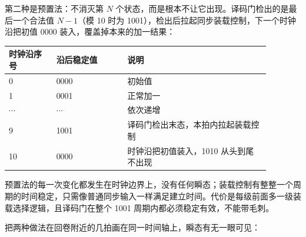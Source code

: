 第二种是预置法：不消灭第 $N$ 个状态，而是根本不让它出现。译码门检出的是最后一个合法值 $N-1$（模 10 时为 1001），检出后拉起同步装载控制，下一个时钟沿把初值 0000 装入，覆盖掉本来的加一结果：

\begin{longtable}{L{0.16\linewidth}L{0.24\linewidth}L{0.48\linewidth}}
\toprule
时钟沿序号 & 沿后稳定值 & 说明 \\
 & 0000 & 初始值 \\
1 & 0001 & 正常加一 \\
$\cdots$ & $\cdots$ & 依次递增 \\
9 & 1001 & 译码门检出末态，本拍内拉起装载控制 \\
10 & 0000 & 时钟沿把初值装入，1010 从头到尾不出现 \\
\bottomrule
\end{longtable}

预置法的每一次变化都发生在时钟边界上，没有任何瞬态；装载控制有整整一个周期的时间稳定，只需像普通同步输入一样满足建立时间。代价是每级前面多一级装载选择逻辑，且译码门在整个 1001 周期内都必须稳定有效，不能带毛刺。

把两种做法在回卷附近的几拍画在同一时间轴上，瞬态有无一眼可见：

